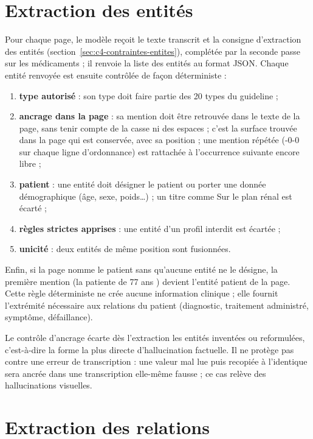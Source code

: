 \section{Extraction des entités}\label{sec:c4-entites}

Pour chaque page, le modèle reçoit le texte transcrit et la consigne d'extraction des entités (section~\ref{sec:c4-contraintes-entites}), complétée par la seconde passe sur les médicaments ; il renvoie la liste des entités au format JSON. Chaque entité renvoyée est ensuite contrôlée de façon déterministe :
\begin{enumerate}
  \item \textbf{type autorisé} : son type doit faire partie des 20 types du guideline ;
  \item \textbf{ancrage dans la page} : sa mention doit être retrouvée dans le texte de la page, sans tenir compte de la casse ni des espaces ; c'est la surface trouvée dans la page qui est conservée, avec sa position ; une mention répétée (-0-0 \fg{} sur chaque ligne d'ordonnance) est rattachée à l'occurrence suivante encore libre ;
  \item \textbf{patient} : une entité  doit désigner le patient ou porter une donnée démographique (âge, sexe, poids\dots) ; un titre comme \og Sur le plan rénal \fg{} est écarté ;
  \item \textbf{règles strictes apprises} : une entité d'un profil interdit est écartée ;
  \item \textbf{unicité} : deux entités de même position sont fusionnées.
\end{enumerate}
Enfin, si la page nomme le patient sans qu'aucune entité ne le désigne, la première mention (\og la patiente de 77 ans \fg{}) devient l'entité patient de la page. Cette règle déterministe ne crée aucune information clinique ; elle fournit l'extrémité nécessaire aux relations du patient (diagnostic, traitement administré, symptôme, défaillance).

Le contrôle d'ancrage écarte dès l'extraction les entités inventées ou reformulées, c'est-à-dire la forme la plus directe d'hallucination factuelle. Il ne protège pas contre une erreur de transcription : une valeur mal lue puis recopiée à l'identique sera ancrée dans une transcription elle-même fausse ; ce cas relève des hallucinations visuelles.

\section{Extraction des relations}\label{sec:c4-relations}

